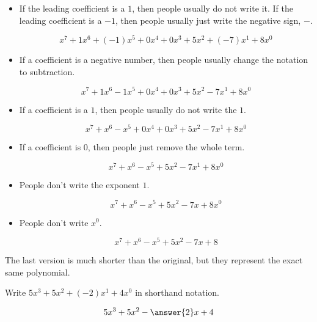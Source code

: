 \documentclass{ximera}
\begin{document}
\begin{itemize}
\item If the leading coefficient is a $1$, then people usually do not write it. If the leading coefficient is a $-1$, then people usually just write the negative sign, $-$.


\[  x^7 + 1 x^6 + (-1) x^5 + 0 x^4 + 0 x^3 + 5 x^2 + (-7) x^1 + 8 x^0              \]


\item If a coefficient is a negative number, then people usually change the notation to subtraction.


\[  x^7 + 1 x^6 - 1 x^5 + 0 x^4 + 0 x^3 + 5 x^2 - 7 x^1 + 8 x^0              \]



\item If a coefficient is a $1$, then people usually do not write the $1$.


\[  x^7 + x^6 - x^5 + 0 x^4 + 0 x^3 + 5 x^2 - 7 x^1 + 8 x^0              \]


\item If a coefficient is $0$, then people just remove the whole term.

\[  x^7 + x^6 - x^5 + 5 x^2 - 7 x^1 + 8 x^0              \]


\item People don't write the exponent $1$.

\[  x^7 + x^6 - x^5 + 5 x^2 - 7 x + 8 x^0              \]



\item People don't write $x^0$.

\[  x^7 + x^6 - x^5 + 5 x^2 - 7 x + 8             \]




\end{itemize}




The last version is much shorter than the original, but they represent the exact same polynomial. \\








\begin{question}

Write $5 x^3 + 5 x^2 + (-2) x^1 + 4 x^0$ in shorthand notation.


\[
5 x^3 + 5 x^2 - \answer{2} x + 4  
\]

\end{question}
\end{document}
